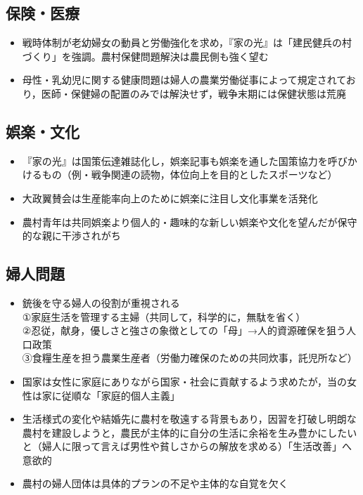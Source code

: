 \documentclass[11pt,autodetect-engine]{jsarticle}%
\begin{document}
 \subsection{保険・医療}
 
 \begin{itemize}
  \item 戦時体制が老幼婦女の動員と労働強化を求め，『家の光』は「建民健兵の村づくり」を強調。農村保健問題解決は農民側も強く望む
  \item 母性・乳幼児に関する健康問題は婦人の農業労働従事によって規定されており，医師・保健婦の配置のみでは解決せず，戦争末期には保健状態は荒廃
\end{itemize}

 \subsection{娯楽・文化 }
 
 \begin{itemize}
  \item 『家の光』は国策伝達雑誌化し，娯楽記事も娯楽を通した国策協力を呼びかけるもの（例・戦争関連の読物，体位向上を目的としたスポーツなど）
  \item 大政翼賛会は生産能率向上のために娯楽に注目し文化事業を活発化
  \item 農村青年は共同娯楽より個人的・趣味的な新しい娯楽や文化を望んだが保守的な親に干渉されがち
\end{itemize}

 \subsection{婦人問題 }
 
 \begin{itemize}
  \item 銃後を守る婦人の役割が重視される
  \\①家庭生活を管理する主婦（共同して，科学的に，無駄を省く）
  \\②忍従，献身，優しさと強さの象徴としての「母」→人的資源確保を狙う人口政策
  \\③食糧生産を担う農業生産者（労働力確保のための共同炊事，託児所など）
  \item 国家は女性に家庭にありながら国家・社会に貢献するよう求めたが，当の女性は家に従順な「家庭的個人主義」
  \item 生活様式の変化や結婚先に農村を敬遠する背景もあり，因習を打破し明朗な農村を建設しようと，農民が主体的に自分の生活に余裕を生み豊かにしたいと（婦人に限って言えば男性や貧しさからの解放を求める）「生活改善」へ意欲的
  \item 農村の婦人団体は具体的プランの不足や主体的な自覚を欠く
\end{itemize}
\end{document}
